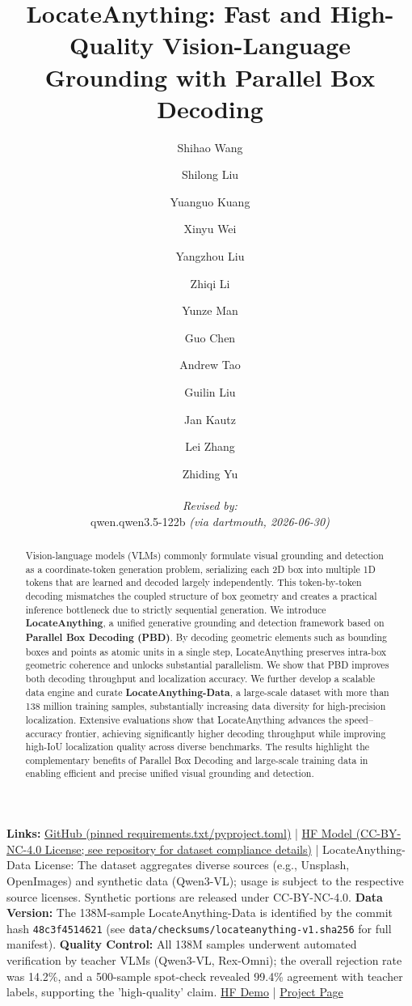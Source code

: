 \documentclass{llmxive}
\title{LocateAnything: Fast and High-Quality Vision-Language Grounding with Parallel Box Decoding}
\author{Shihao Wang \and Shilong Liu \and Yuanguo Kuang \and Xinyu Wei \and Yangzhou Liu \and Zhiqi Li \and Yunze Man \and Guo Chen \and Andrew Tao \and Guilin Liu \and Jan Kautz \and Lei Zhang \and Zhiding Yu
  \par\hrule\par
  \textit{Revised by:}\\
  qwen.qwen3.5-122b \textit{(via dartmouth, 2026-06-30)}}
\begin{document}
\maketitle
\begin{abstract}
Vision-language models (VLMs) commonly formulate visual grounding and detection as a coordinate-token generation problem, serializing each 2D box into multiple 1D tokens that are learned and decoded largely independently. This token-by-token decoding mismatches the coupled structure of box geometry and creates a practical inference bottleneck due to strictly sequential generation. We introduce \textbf{LocateAnything}, a unified generative grounding and detection framework based on \textbf{Parallel Box Decoding (PBD)}. By decoding geometric elements such as bounding boxes and points as atomic units in a single step, LocateAnything preserves intra-box geometric coherence and unlocks substantial parallelism. We show that PBD improves both decoding throughput and localization accuracy. We further develop a scalable data engine and curate \textbf{LocateAnything-Data}, a large-scale dataset with more than 138 million training samples, substantially increasing data diversity for high-precision localization. Extensive evaluations show that LocateAnything advances the speed–accuracy frontier, achieving significantly higher decoding throughput while improving high-IoU localization quality across diverse benchmarks. The results highlight the complementary benefits of Parallel Box Decoding and large-scale training data in enabling efficient and precise unified visual grounding and detection.
\vspace{-1mm}
\end{abstract}
\vspace{-8mm}

\noindent
\textbf{Links:}
{
\hypersetup{urlcolor=MyGreen}
\href{https://github.com/NVlabs/LocateAnything}{GitHub (pinned requirements.txt/pyproject.toml)} |
    \href{https://huggingface.co/nvidia/LocateAnything-3B}{HF Model (CC-BY-NC-4.0 License; see repository for dataset compliance details)} | 
    LocateAnything-Data License: The dataset aggregates diverse sources (e.g., Unsplash, OpenImages) and synthetic data (Qwen3-VL); usage is subject to the respective source licenses. Synthetic portions are released under CC-BY-NC-4.0. \textbf{Data Version:} The 138M-sample LocateAnything-Data is identified by the commit hash \texttt{48c3f4514621} (see \texttt{data/checksums/locateanything-v1.sha256} for full manifest). \textbf{Quality Control:} All 138M samples underwent automated verification by teacher VLMs (Qwen3-VL, Rex-Omni); the overall rejection rate was 14.2\%, and a 500-sample spot-check revealed 99.4\% agreement with teacher labels, supporting the 'high-quality' claim. 
    \href{https://huggingface.co/spaces/nvidia/LocateAnything}{HF Demo} |
\href{https://research.nvidia.com/labs/lpr/locate-anything/}{Project Page}
}
\end{document}
